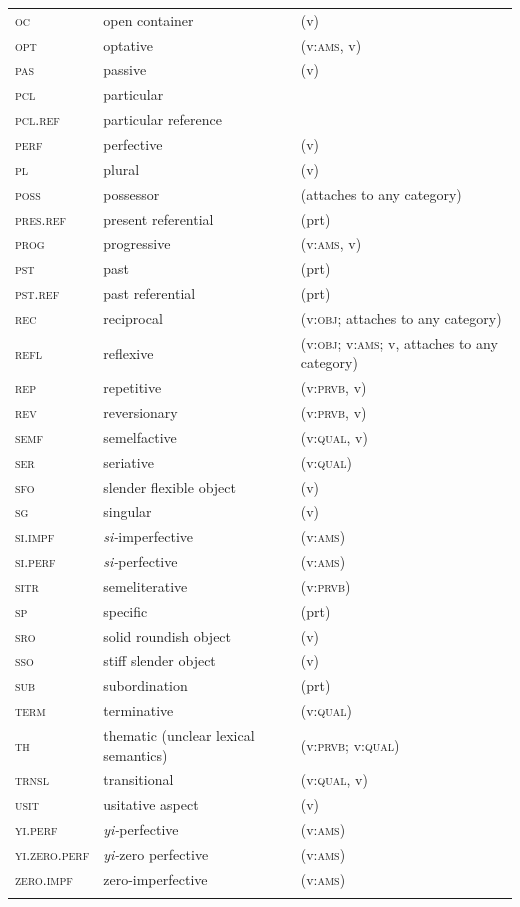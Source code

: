 \begin{xltabular}{\textwidth}{lXX}
\textsc{oc} & open container & (v)\\
\textsc{opt} & optative & (v:\textsc{ams}, v)\\
\textsc{pas} & passive & (v)\\
\textsc{pcl} & particular&\\
\textsc{pcl}.\textsc{ref} & particular reference\\
\textsc{perf} & perfective & (v)\\
\textsc{pl} & plural & (v)\\
\textsc{poss} & possessor & (attaches to any category)\\
\textsc{pres}.\textsc{ref} & present referential & (prt)\\
\textsc{prog} & progressive & (v:\textsc{ams}, v)\\
\textsc{pst} & past & (prt)\\
\textsc{pst}.\textsc{ref} & past referential & (prt)\\
\textsc{rec} & reciprocal & (v:\textsc{obj}; attaches to any category)\\
\textsc{refl} & reflexive & (v:\textsc{obj}; v:\textsc{ams}; v, attaches to any category)\\
\textsc{rep} & repetitive & (v:\textsc{prvb}, v)\\
\textsc{rev} & reversionary & (v:\textsc{prvb}, v)\\
\textsc{semf} & semelfactive & (v:\textsc{qual}, v)\\
\textsc{ser} & seriative & (v:\textsc{qual})\\
\textsc{sfo} & slender flexible object & (v)\\
\textsc{sg} & singular & (v)\\
\textsc{si}.\textsc{impf} & \textit{si-}imperfective & (v:\textsc{ams})\\
\textsc{si}.\textsc{perf} & \textit{si-}perfective & (v:\textsc{ams})\\
\textsc{sitr} & semeliterative & (v:\textsc{prvb})\\
\textsc{sp} & specific & (prt)\\
\textsc{sro} & solid roundish object & (v)\\
\textsc{sso} & stiff slender object & (v)\\
\textsc{sub} & subordination & (prt)\\
\textsc{term} & terminative & (v:\textsc{qual})\\
\textsc{th} & thematic (unclear lexical \mbox{semantics}) & (v:\textsc{prvb}; v:\textsc{qual})\\
\textsc{trnsl} & transitional & (v:\textsc{qual}, v)\\
\textsc{usit} & usitative aspect & (v)\\
\textsc{yi}.\textsc{perf} & \textit{yi-}perfective & (v:\textsc{ams})\\
\textsc{yi}.\textsc{zero}.\textsc{perf} & \textit{yi-}zero perfective & (v:\textsc{ams})\\
\textsc{zero}.\textsc{impf} & zero-imperfective & (v:\textsc{ams})\\
\lspbottomrule
\end{xltabular}

